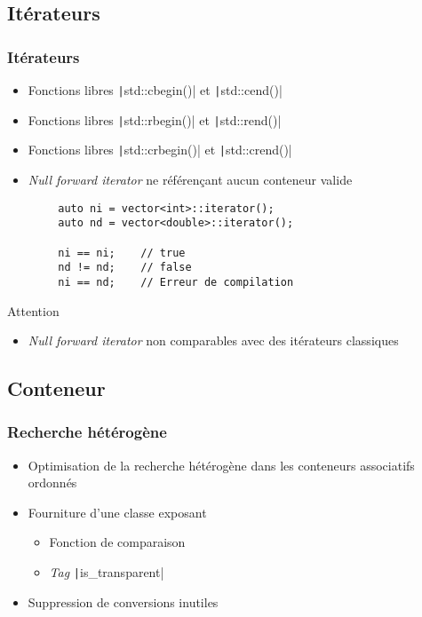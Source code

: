 \documentclass[C++.tex]{subfiles}
\begin{document}
\subsection*{Itérateurs}
\begin{frame}[fragile]
	\frametitle{Itérateurs}
	\begin{itemize}
		\item Fonctions libres \texttt|std::cbegin()| et \texttt|std::cend()|
		\item Fonctions libres \texttt|std::rbegin()| et \texttt|std::rend()|
		\item Fonctions libres \texttt|std::crbegin()| et \texttt|std::crend()|
		\item \textit{Null forward iterator} ne référençant aucun conteneur valide
	\end{itemize}

	\begin{verbatim}
		auto ni = vector<int>::iterator();
		auto nd = vector<double>::iterator();

		ni == ni;    // true
		nd != nd;    // false
		ni == nd;    // Erreur de compilation
	\end{verbatim}

	\begin{alertblock}{Attention}
		\begin{itemize}
			\item \textit{Null forward iterator} non comparables avec des itérateurs classiques
		\end{itemize}
	\end{alertblock}

\end{frame}

\subsection*{Conteneur}
\begin{frame}[fragile]
	\frametitle{Recherche hétérogène}
	\begin{itemize}
		\item Optimisation de la recherche hétérogène dans les conteneurs associatifs ordonnés
		\item Fourniture d'une classe exposant
		\begin{itemize}
			\item Fonction de comparaison
			\item \textit{Tag} \texttt|is_transparent|
		\end{itemize}
		\item Suppression de conversions inutiles
	\end{itemize}

\end{frame}
\end{document}
